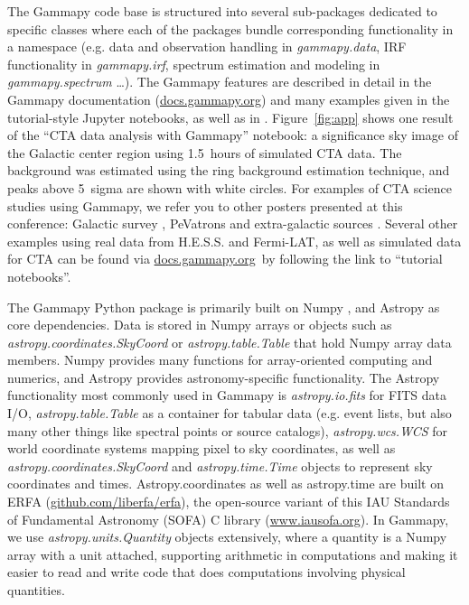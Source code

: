 \documentclass{PoS}
\newcommand{\urlGammapyDocs}{\href{http://docs.gammapy.org}{docs.gammapy.org}}
\newcommand{\urlErfa}{\href{https://github.com/liberfa/erfa}{github.com/liberfa/erfa}}
\newcommand{\urlSofa}{\href{http://www.iausofa.org}{www.iausofa.org}}
\begin{document}
The Gammapy code base is structured into several sub-packages dedicated to
specific classes  where each of the packages bundle corresponding functionality
in a namespace (e.g. data and observation handling in \textit{gammapy.data}, IRF
functionality in \textit{gammapy.irf}, spectrum estimation and modeling in
\textit{gammapy.spectrum} \ldots). The Gammapy features are described in detail
in the Gammapy documentation (\urlGammapyDocs) and many examples given in the
tutorial-style Jupyter notebooks, as well as in \cite{gammapy-icrc2015}.
Figure~\ref{fig:app} shows one result of the ``CTA data analysis with Gammapy''
notebook: a significance sky image of the Galactic center region using 1.5~hours
of simulated CTA data. The background was estimated using the ring background
estimation technique, and peaks above 5~sigma are shown with white circles. For
examples of CTA science studies using Gammapy, we refer you to other posters
presented at this conference: Galactic survey \cite{roberta}, PeVatrons
\cite{cyril} and extra-galactic sources \cite{julien}. Several other examples
using real data from H.E.S.S. and Fermi-LAT, as well as simulated data for CTA
can be found via \urlGammapyDocs\ by following the link to ``tutorial
notebooks''.
 
The Gammapy Python package is primarily built on Numpy \cite{numpy}, and Astropy
\cite{astropy} as core dependencies. Data is stored in Numpy arrays or objects
such as \textit{astropy.coordinates.SkyCoord} or \textit{astropy.table.Table}
that hold Numpy array data members. Numpy provides many functions for
array-oriented computing and numerics, and Astropy provides astronomy-specific
functionality. The Astropy functionality most commonly used in Gammapy is
\textit{astropy.io.fits} for FITS data I/O, \textit{astropy.table.Table} as a
container for tabular data (e.g. event lists, but also many other things like
spectral points or source catalogs), \textit{astropy.wcs.WCS} for world
coordinate systems mapping pixel to sky coordinates, as well as
\textit{astropy.coordinates.SkyCoord} and \textit{astropy.time.Time} objects to
represent sky coordinates and times. Astropy.coordinates  as well as
astropy.time are built on ERFA (\urlErfa), the open-source variant of this IAU
Standards of Fundamental Astronomy (SOFA) C library (\urlSofa). In Gammapy, we
use \textit{astropy.units.Quantity} objects extensively, where a quantity is a
Numpy array with a unit attached, supporting arithmetic in computations and
making it easier to read and write code that does computations involving
physical quantities.
\end{document}
